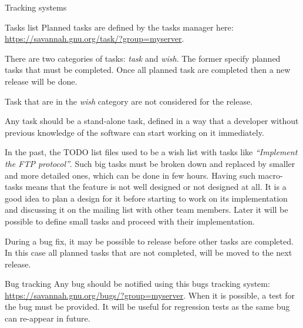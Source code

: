 \documentclass[12pt]{article}
\begin{document}
\begin{section}{Tracking systems}
\begin{subsection}{Tasks list}
Planned tasks are defined by the tasks manager here:
\url{https://savannah.gnu.org/task/?group=myserver}.

There are two categories of tasks: \textit{task} and \textit{wish}.
The former specify planned tasks that must be completed.  Once all
planned task are completed then a new release will be done.

Task that are in the \textit{wish} category are not considered for the
release.

Any task should be a stand-alone task, defined in a way that a developer without
previous knowledge of the software can start working on it immediately.

In the past, the TODO list files used to be a wish list with tasks like
\textit{``Implement the FTP protocol''}. Such big tasks must be
broken down and replaced by smaller and more detailed ones, which can be
done in few hours.
Having such macro-tasks means that the feature is not well designed or
not designed at all. It is a good idea to plan a design for it
before starting to work on its implementation and discussing it on the
mailing list with other team members.
Later it will be possible to define small tasks and proceed with their
implementation.

During a bug fix, it may be possible to release before other tasks are
completed. In this case all planned tasks that are not completed, will be
moved to the next release.
\end{subsection}

\begin{subsection}{Bug tracking}
Any bug should be notified using this bugs tracking system:
\url{https://savannah.gnu.org/bugs/?group=myserver}.
When it is possible, a test for the bug must be provided. It will be
useful for regression tests as the same bug can re-appear in
future.
\end{subsection}
\end{section}
\end{document}
